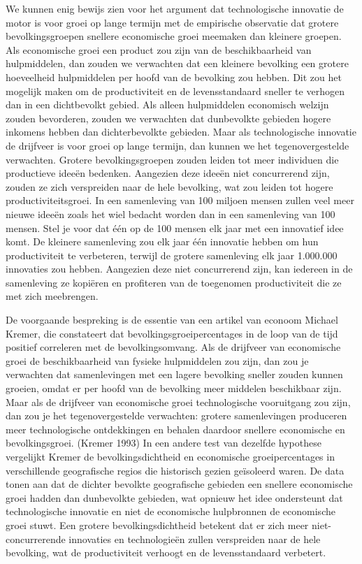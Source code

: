 \documentclass[
  a5paper,
  smalldemyvopaper,11pt,twoside,onecolumn,openright,extrafontsizes,
hidelinks]{memoir}
\begin{document}
We kunnen enig bewijs zien voor het argument dat technologische
innovatie de motor is voor groei op lange termijn met de empirische
observatie dat grotere bevolkingsgroepen snellere economische groei
meemaken dan kleinere groepen. Als economische groei een product zou
zijn van de beschikbaarheid van hulpmiddelen, dan zouden we verwachten
dat een kleinere bevolking een grotere hoeveelheid hulpmiddelen per
hoofd van de bevolking zou hebben. Dit zou het mogelijk maken om de
productiviteit en de levensstandaard sneller te verhogen dan in een
dichtbevolkt gebied. Als alleen hulpmiddelen economisch welzijn zouden
bevorderen, zouden we verwachten dat dunbevolkte gebieden hogere
inkomens hebben dan dichterbevolkte gebieden. Maar als technologische
innovatie de drijfveer is voor groei op lange termijn, dan kunnen we het
tegenovergestelde verwachten. Grotere bevolkingsgroepen zouden leiden
tot meer individuen die productieve ideeën bedenken. Aangezien deze
ideeën niet concurrerend zijn, zouden ze zich verspreiden naar de hele
bevolking, wat zou leiden tot hogere productiviteitsgroei. In een
samenleving van 100 miljoen mensen zullen veel meer nieuwe ideeën zoals
het wiel bedacht worden dan in een samenleving van 100 mensen. Stel je
voor dat één op de 100 mensen elk jaar met een innovatief idee komt. De
kleinere samenleving zou elk jaar één innovatie hebben om hun
productiviteit te verbeteren, terwijl de grotere samenleving elk jaar
1.000.000 innovaties zou hebben. Aangezien deze niet concurrerend zijn,
kan iedereen in de samenleving ze kopiëren en profiteren van de
toegenomen productiviteit die ze met zich meebrengen.

De voorgaande bespreking is de essentie van een artikel van econoom
Michael Kremer, die constateert dat bevolkingsgroeipercentages in de
loop van de tijd positief correleren met de bevolkingsomvang. Als de
drijfveer van economische groei de beschikbaarheid van fysieke
hulpmiddelen zou zijn, dan zou je verwachten dat samenlevingen met een
lagere bevolking sneller zouden kunnen groeien, omdat er per hoofd van
de bevolking meer middelen beschikbaar zijn. Maar als de drijfveer van
economische groei technologische vooruitgang zou zijn, dan zou je het
tegenovergestelde verwachten: grotere samenlevingen produceren meer
technologische ontdekkingen en behalen daardoor snellere economische en
bevolkingsgroei. (Kremer 1993) In een andere test van dezelfde hypothese
vergelijkt Kremer de bevolkingsdichtheid en economische groeipercentages
in verschillende geografische regios die historisch gezien geïsoleerd
waren. De data tonen aan dat de dichter bevolkte geografische gebieden
een snellere economische groei hadden dan dunbevolkte gebieden, wat
opnieuw het idee ondersteunt dat technologische innovatie en niet de
economische hulpbronnen de economische groei stuwt. Een grotere
bevolkingsdichtheid betekent dat er zich meer niet-concurrerende
innovaties en technologieën zullen verspreiden naar de hele bevolking,
wat de productiviteit verhoogt en de levensstandaard verbetert.
\end{document}
